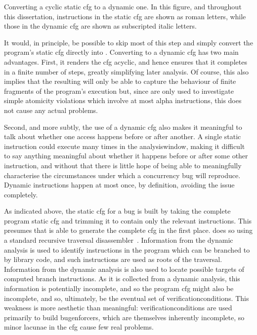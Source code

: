 \begin{sanefig}
\caption{Converting a cyclic \gls{static cfg} to a dynamic one.  In
  this figure, and throughout this dissertation, instructions in the
  \gls{static cfg} are shown as roman letters, while those in the
  \gls{dynamic cfg} are shown as subscripted italic letters.}
\label{fig:cyclic_cfg}
\end{sanefig}

It would, in principle, be possible to skip most of this step and
simply convert the program's \gls{static cfg} directly into
{\AStateMachine}.  Converting to a \gls{dynamic cfg} has two main
advantages.  First, it renders the \gls{cfg} acyclic, and hence
ensures that it completes in a finite number of steps, greatly
simplifying later analysis.  Of course, this also implies that the
resulting {\StateMachine} will only be able to capture the behaviour
of finite fragments of the program's execution but, since
{\StateMachines} are only used to investigate \glspl{simple atomicity
  violation} which involve at most \gls{alpha} instructions, this does
not cause any actual problems.

Second, and more subtly, the use of a \gls{dynamic cfg} also makes it
meaningful to talk about whether one access happens before or after
another.  A single static instruction could execute many times in the
\gls{analysiswindow}, making it difficult to say anything meaningful
about whether it happens before or after some other instruction, and
without that there is little hope of being able to meaningfully
characterise the circumstances under which a concurrency bug will
reproduce.  Dynamic instructions happen at most once, by definition,
avoiding the issue completely.

As indicated above, the \gls{static cfg} for a bug is built by taking
the complete program \gls{static cfg} and trimming it to contain only
the relevant instructions.  This presumes that {\technique} is able to
generate the complete \gls{cfg} in the first place.  {\Technique} does
so using a standard recursive traversal disassembler~\cite{Schwarz}.
Information from the dynamic analysis is used to identify instructions
in the program which can be branched to by library code, and such
instructions are used as roots of the traversal.  Information from the
dynamic analysis is also used to locate possible targets of computed
branch instructions.  As it is collected from a dynamic analysis, this
information is potentially incomplete, and so the program \gls{cfg}
might also be incomplete, and so, ultimately, be the eventual set of
\glspl{verificationcondition}.  This weakness is more aesthetic than
meaningful: \glspl{verificationcondition} are used primarily to build
\glspl{bugenforcer}, which are themselves inherently incomplete, so
minor lacunae in the \gls{cfg} cause few real problems.


